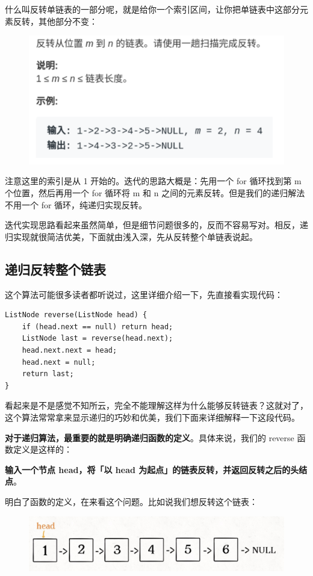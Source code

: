 \documentclass[12pt]{article}
\begin{document}
什么叫反转单链表的一部分呢，就是给你一个索引区间，让你把单链表中这部分元素反转，其他部分不变：
\begin{figure}[H]
    \centering
    \includegraphics[width=.5\textwidth]{fig/Reverse_Single_List_1.png}
\end{figure}

注意这里的索引是从 1 开始的。迭代的思路大概是：先用一个 for 循环找到第 m 个位置，然后再用一个 for 循环将 m 和 n 之间的元素反转。但是我们的递归解法不用一个 for 循环，纯递归实现反转。

迭代实现思路看起来虽然简单，但是细节问题很多的，反而不容易写对。相反，递归实现就很简洁优美，下面就由浅入深，先从反转整个单链表说起。

\subsection{递归反转整个链表}
这个算法可能很多读者都听说过，这里详细介绍一下，先直接看实现代码：
\begin{lstlisting}
ListNode reverse(ListNode head) {
    if (head.next == null) return head;
    ListNode last = reverse(head.next);
    head.next.next = head;
    head.next = null;
    return last;
}
\end{lstlisting}
看起来是不是感觉不知所云，完全不能理解这样为什么能够反转链表？这就对了，这个算法常常拿来显示递归的巧妙和优美，我们下面来详细解释一下这段代码。

\textbf{对于递归算法，最重要的就是明确递归函数的定义}。具体来说，我们的 reverse 函数定义是这样的：

\textbf{输入一个节点 head，将「以 head 为起点」的链表反转，并返回反转之后的头结点}。

明白了函数的定义，在来看这个问题。比如说我们想反转这个链表：
\begin{figure}[H]
    \centering
    \includegraphics[width=.5\textwidth]{fig/Reverse_Single_List_2.png}
\end{figure}
\end{document}
